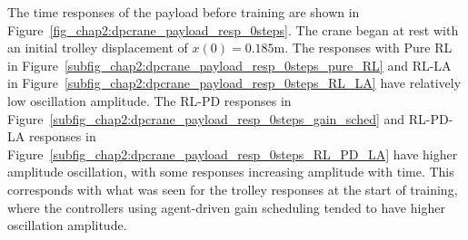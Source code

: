 %
The time responses of the payload before training are shown in Figure~\ref{fig_chap2:dpcrane_payload_resp_0steps}. The crane began at rest with an initial trolley displacement of $x(0)=0.185\si{\meter}$. The responses with Pure RL in Figure~\ref{subfig_chap2:dpcrane_payload_resp_0steps_pure_RL} and RL-LA in Figure~\ref{subfig_chap2:dpcrane_payload_resp_0steps_RL_LA} have relatively low oscillation amplitude. The RL-PD responses in Figure~\ref{subfig_chap2:dpcrane_payload_resp_0steps_gain_sched} and RL-PD-LA responses in Figure~\ref{subfig_chap2:dpcrane_payload_resp_0steps_RL_PD_LA} have higher amplitude oscillation, with some responses increasing amplitude with time. This corresponds with what was seen for the trolley responses at the start of training, where the controllers using agent-driven gain scheduling tended to have higher oscillation amplitude.

